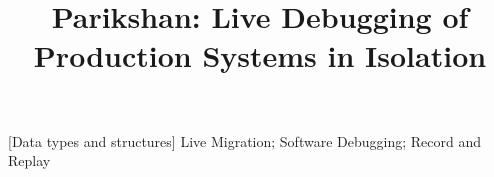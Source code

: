 \documentclass[10pt,preprint,numbers]{sigplanconf}
\begin{document}



\title{Parikshan\xspace: Live Debugging of Production Systems in Isolation}



\maketitle



{\footnotesize
{}[Data
    types and structures]
\keywords
Live Migration; Software Debugging; Record and Replay
}



%
%



%
%






%




\end{document}
